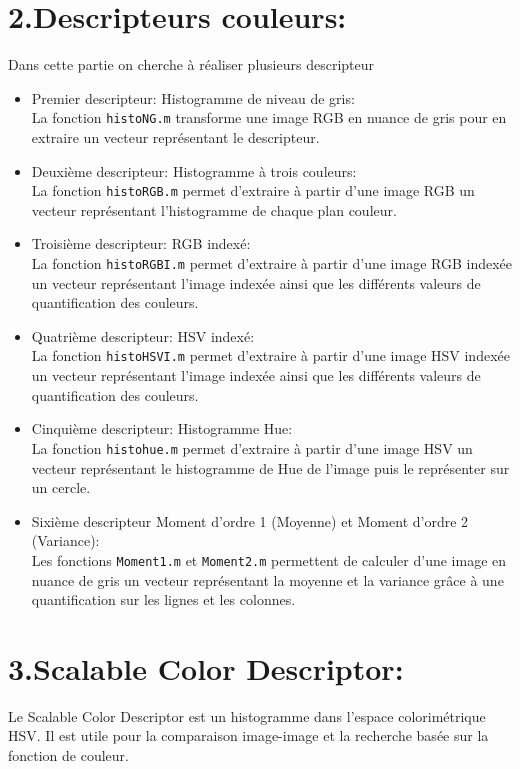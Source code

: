 \documentclass[12pt,a4paper,notitlepage]{report}
\begin{document}
\section*{2.Descripteurs couleurs:}
Dans cette partie on cherche à réaliser plusieurs descripteur 
\begin{itemize}
\item Premier descripteur: Histogramme de niveau de gris:\\
La fonction \texttt{histoNG.m} transforme une image RGB en nuance de gris pour en extraire un vecteur représentant le descripteur.
\item Deuxième descripteur: Histogramme à trois couleurs:\\
La fonction \texttt{histoRGB.m} permet d'extraire à partir d'une image RGB un vecteur représentant l'histogramme de chaque plan couleur.
\item Troisième descripteur: RGB indexé:\\
La fonction \texttt{histoRGBI.m} permet d'extraire à partir d'une image RGB indexée un vecteur représentant l'image indexée ainsi que les différents valeurs de quantification des couleurs.
\item Quatrième descripteur: HSV indexé:\\
La fonction \texttt{histoHSVI.m} permet d'extraire à partir d'une image HSV indexée un vecteur représentant l'image indexée ainsi que les différents valeurs de quantification des couleurs.
\item Cinquième descripteur: Histogramme Hue:\\
La fonction \texttt{histohue.m} permet d'extraire à partir d'une image HSV un vecteur représentant le histogramme de Hue de l'image puis le représenter sur un cercle.
\item Sixième descripteur Moment d'ordre 1 (Moyenne) et Moment d'ordre 2  (Variance):\\
Les fonctions \texttt{Moment1.m} et \texttt{Moment2.m} permettent de calculer d'une image en nuance de gris un vecteur représentant la moyenne et la variance grâce à une quantification sur les lignes et les colonnes.
\end{itemize}

\section*{3.Scalable Color Descriptor:}
Le Scalable Color Descriptor est un histogramme dans l'espace colorimétrique HSV. Il est utile pour la comparaison image-image et la recherche basée sur la fonction de couleur.
\end{document}
